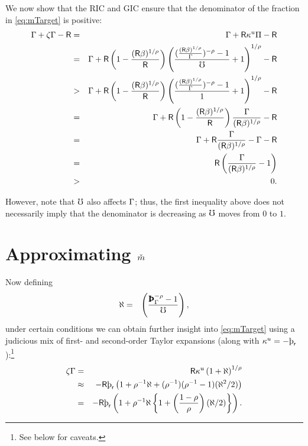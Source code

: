 \message{ !name(TractableBufferStock.tex)}\documentclass{handout}
\begin{document}
We now show that the RIC and GIC ensure that the denominator of the fraction in \eqref{eq:mTarget} is positive: \pagebreak
\begin{eqnarray*}
\Gamma + \zeta \Gamma - \mathsf{R} & = & \Gamma + \mathsf{R} \kappa^{u} \Pi - \mathsf{R}
 \\& = & \Gamma + \mathsf{R} \left(1- \frac{(\mathsf{R} \beta)^{1/\rho}}{\mathsf{R}}\right) \left(\frac{(\frac{(\mathsf{R}\beta)^{1/\rho}}{\Gamma})^{-\rho}-1}{\mho}+1\right)^{1/\rho}-\mathsf{R}
 \\& > &  \Gamma+\mathsf{R} \left(1-\frac{(\mathsf{R}\beta)^{1/\rho}}{\mathsf{R}}\right)
\left(\frac{(\frac{(\mathsf{R}\beta)^{1/\rho}}{\Gamma})^{-\rho}-1}{1}+1\right)^{1/\rho}-\mathsf{R}
 \\& = & \Gamma+\mathsf{R}\left(1-\frac{(\mathsf{R}\beta)^{1/\rho}}{\mathsf{R}}\right)\frac{\Gamma}{(\mathsf{R}\beta)^{1/\rho}}-\mathsf{R}
 \\& = & \Gamma+\mathsf{R} \frac{\Gamma}{(\mathsf{R}\beta)^{1/\rho}}- \Gamma - \mathsf{R}
 \\& = & \mathsf{R} \left(\frac{\Gamma}{(\mathsf{R}\beta)^{1/\rho}}-1\right)
 \\& > & 0.
\end{eqnarray*}

However, note that $\mho$ also affects $\Gamma$; thus, the first inequality above does
not necessarily imply that the denominator is decreasing as $\mho$ moves from $0$ to $1$.


\section{Approximating $\mTarg^{\null}$}

Now defining
\begin{eqnarray}
  \aleph & = & \left(\frac{\PatPGro^{-\CRRA} - 1}{\urate}\right),
\end{eqnarray}
under certain conditions we can obtain further insight into \eqref{eq:mTarget} using a judicious mix of first- and second-order Taylor expansions (along with $\MPCU = -\patr$):\footnote{See below for caveats.}
\begin{eqnarray}
  \label{eq:zetaExp}
  \zeta\PGro & = & \Rfree \MPCU \left(1+\aleph\right)^{1/\CRRA}
\\ & \approx & -\Rfree \patr \left(1+\CRRA^{-1}\aleph+(\CRRA^{-1})(\CRRA^{-1}-1)(\aleph^{2}/2)\right)
\\ & = & -\Rfree \patr \left(1+\CRRA^{-1}\aleph\left\{1+\left(\frac{1-\CRRA}{\CRRA}\right)(\aleph/2)\right\}\right) \label{eq:zetaTaylor2}
.
\end{eqnarray}
\end{document}
